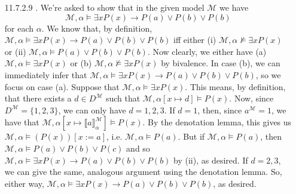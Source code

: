 \begin{itemize}
                        \item[11.7.2.9]. We're asked to show that in the
                          given model $\mathcal{M}$ we have
                          \[\mathcal{M},\alpha\vDash \exists xP(x)\to
                          P(a)\lor P(b)\lor P(b)\] for each
                          $\alpha$. We know that, by definition, $\mathcal{M},\alpha\vDash \exists xP(x)\to
                          P(a)\lor P(b)\lor P(b)$ iff either (i)
                          $\mathcal{M},\alpha\nvDash \exists xP(x)$ or (ii)
                          $\mathcal{M},\alpha\vDash
                          P(a)\lor P(b)\lor P(b)$. Now clearly, we
                          either have (a) $\mathcal{M},\alpha\vDash
                          \exists xP(x)$ or (b)
                          $\mathcal{M},\alpha\nvDash \exists xP(x)$ by
                          bivalence. In case (b), we can immediately
                          infer that $\mathcal{M},\alpha\vDash \exists xP(x)\to
                          P(a)\lor P(b)\lor P(b)$, so we focus on case
                          (a). Suppose that $\mathcal{M},\alpha\vDash
                          \exists xP(x)$. This means, by definition,
                          that there exists a $d\in D^\mathcal{M}$
                          such that $\mathcal{M},\alpha[x\mapsto d]\vDash
                           P(x)$. Now, since
                           $D^\mathcal{M}=\{1,2,3\}$, we can only have
                           $d=1,2,3$. If $d=1$, then, since
                           $a^\mathcal{M}=1$, we have that
                           $\mathcal{M},\alpha[x\mapsto \llbracket
                           a\rrbracket^\mathcal{M}_\alpha]\vDash 
                           P(x)$. By the denotation lemma, this gives
                           us $\mathcal{M},\alpha\vDash 
                           (P(x))[x:=a]$, i.e. $\mathcal{M},\alpha\vDash 
                           P(a)$. But if $\mathcal{M},\alpha\vDash 
                           P(a)$, then $\mathcal{M},\alpha\vDash 
                           P(a)\lor P(b)\lor P(c)$ and so $\mathcal{M},\alpha\vDash \exists xP(x)\to
                          P(a)\lor P(b)\lor P(b)$ by (ii), as
                          desired. If $d=2,3$, we can give the same,
                          analogous argument using the denotation
                          lemma. So, either way,  $\mathcal{M},\alpha\vDash \exists xP(x)\to
                          P(a)\lor P(b)\lor P(b)$, as desired.


\end{itemize}

